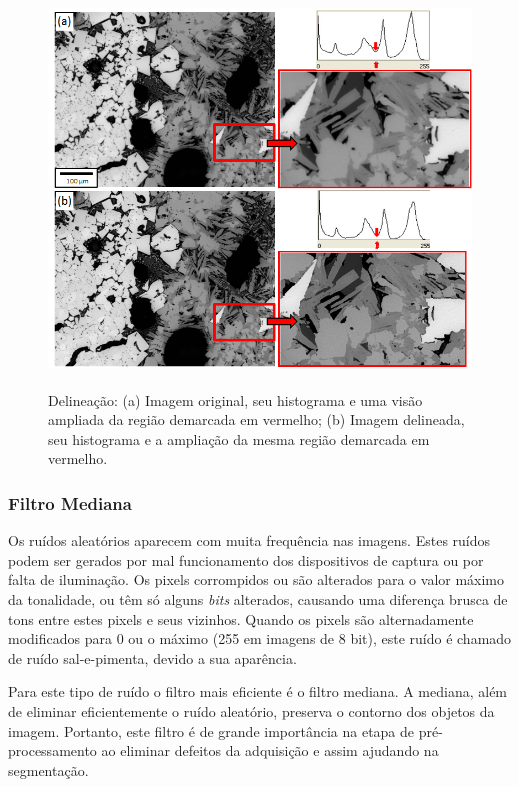 \begin{figure} [h]
  \begin{center}
    \includegraphics[height=297pt,width=350pt]{images/fig_img-delin}
    \caption{Delineação: (a) Imagem original, seu histograma e uma
      visão ampliada da região demarcada em vermelho; (b) Imagem
      delineada, seu histograma e a ampliação da mesma região
      demarcada em vermelho.\cite{74}}\label{fig:img-delin}
  \end{center}
\end{figure}

\subsubsection{Filtro Mediana}

Os ruídos aleatórios aparecem com muita frequência nas imagens. Estes
ruídos podem ser gerados por mal funcionamento dos dispositivos de
captura ou por falta de iluminação.\cite{89} Os pixels corrompidos ou
são alterados para o valor máximo da tonalidade, ou têm só alguns
\textit{bits} alterados, causando uma diferença brusca de tons entre
estes pixels e seus vizinhos. Quando os pixels são alternadamente
modificados para $0$ ou o máximo (255 em imagens de 8 bit), este ruído
é chamado de ruído sal-e-pimenta, devido a sua aparência.

Para este tipo de ruído o filtro mais eficiente é o filtro
mediana.\cite{90} A mediana, além de eliminar eficientemente o ruído
aleatório, preserva o contorno dos objetos da imagem.\cite{91}
Portanto, este filtro é de grande importância na etapa de
pré-processamento ao eliminar defeitos da adquisição e assim ajudando
na segmentação.


